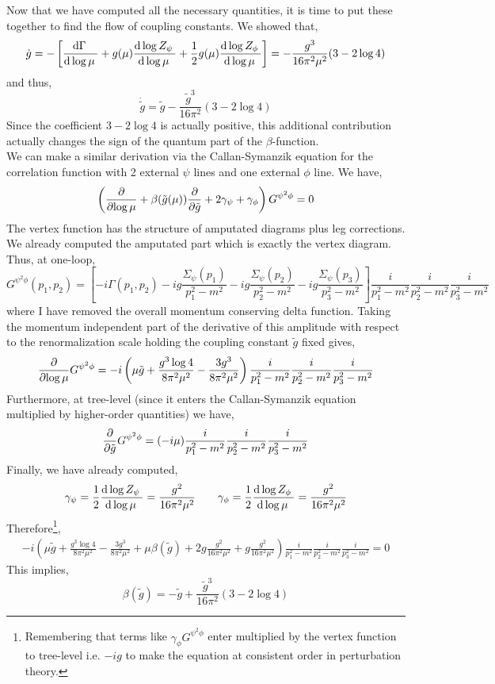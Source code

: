 \documentclass[12pt]{article}
\begin{document}
Now that we have computed all the necessary quantities, it is time to put these together to find the flow of coupling constants. We showed that,
\[ \dot{g} = - \left[ \frac{\mathrm{d}\Gamma \:}{\mathrm{d}\log{\mu} \:} + g(\mu) \frac{\mathrm{d}\log{Z_{\psi}} \:}{\mathrm{d}\log{\mu} \:} + \frac{1}{2} g(\mu) \frac{\mathrm{d}\log{Z_{\phi}} \:}{\mathrm{d}\log{\mu} \:} \right] = - \frac{g^3}{16 \pi^2 \mu^2} (3 - 2 \log{4}) \]
and thus,
\[ \dot{\tilde{g}} = \tilde{g} - \frac{\tilde{g}^3}{16 \pi^2} (3 - 2 \log{4})  \]
Since the coefficient $3 - 2 \log{4}$ is actually positive, this additional contribution actually changes the sign of the quantum part of the $\beta$-function.
\bigskip\\
We can make a similar derivation via the Callan-Symanzik equation for the correlation function with 2 external $\psi$ lines and one external $\phi$ line. We have,
\[ \left( \frac{\partial{}}{\partial{\log{\mu}}} + \beta(\tilde{g}(\mu)) \frac{\partial{}}{\partial{\tilde{g}}} + 2 \gamma_\psi + \gamma_\phi \right) G^{\psi^2 \phi} = 0 \]  
The vertex function has the structure of amputated diagrams plus leg corrections. We already computed the amputated part which is exactly the vertex diagram. Thus, at one-loop,
\[ G^{\psi^2 \phi}(p_1, p_2) = \left[ - i \Gamma(p_1, p_2)  - i g \frac{\Sigma_{\psi}(p_1)}{p_1^2 - m^2} - i g \frac{\Sigma_{\psi}(p_2)}{p_2^2 - m^2} - i g \frac{\Sigma_{\psi}(p_3)}{p_3^2 - m^2}\right] \frac{i}{p_1^2 - m^2} \frac{i}{p_2^2 - m^2} \frac{i}{p_3^2 - m^2}  \]
where I have removed the overall momentum conserving delta function. Taking the momentum independent part of the derivative of this amplitude with respect to the renormalization scale holding the coupling constant $\tilde{g}$ fixed gives,
\[ \frac{\partial{}}{\partial{\log{\mu}}} G^{\psi^2 \phi} = -i \left(\mu \tilde{g} + \frac{g^3 \log{4}}{8 \pi^2 \mu^2} - \frac{3 g^3}{8 \pi^2 \mu^2} \right) \frac{i}{p_1^2 - m^2} \frac{i}{p_2^2 - m^2} \frac{i}{p_3^2 - m^2} \]
Furthermore, at tree-level (since it enters the Callan-Symanzik equation multiplied by higher-order quantities) we have,
\[ \frac{\partial{}}{\partial{\tilde{g}}} G^{\psi^2 \phi} = (-i \mu) \frac{i}{p_1^2 - m^2} \frac{i}{p_2^2 - m^2} \frac{i}{p_3^2 - m^2} \]
Finally, we have already computed,
\begin{align*}
\gamma_\psi = \frac{1}{2} \frac{\mathrm{d}\log{Z_\psi} \:}{\mathrm{d}\log{\mu} \:} = \frac{g^2}{16 \pi^2 \mu^2} \quad \quad \gamma_\phi = \frac{1}{2} \frac{\mathrm{d}\log{Z_\phi} \:}{\mathrm{d}\log{\mu} \:} = \frac{g^2}{16 \pi^2 \mu^2}
\end{align*}
Therefore\footnote{Remembering that terms like $\gamma_\phi G^{\psi^2 \phi}$ enter multiplied by the vertex function to tree-level i.e. $-ig$ to make the equation at consistent order in perturbation theory.},
\begin{align*}
- i \left( \mu \tilde{g} + \frac{g^3 \log{4}}{8 \pi^2 \mu^2} - \frac{3 g^3}{8 \pi^2 \mu^2} + \mu \beta(\tilde{g}) + 2g \frac{g^2}{16 \pi^2 \mu^2} + g \frac{g^2}{16 \pi^2 \mu^2} \right) \frac{i}{p_1^2 - m^2} \frac{i}{p_2^2 - m^2} \frac{i}{p_3^2 - m^2} = 0
\end{align*}
This implies,
\[ \beta(\tilde{g}) = - \tilde{g} + \frac{\tilde{g}^3}{16 \pi^2} \left( 3 - 2 \log{4} \right) \]
\end{document}
